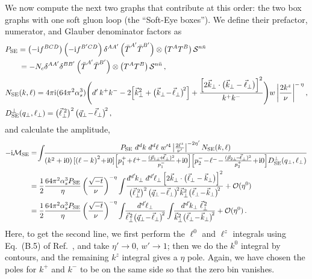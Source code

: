 \documentclass[letterpaper,11pt]{article}
\def\cS{\mathcal{S}}
\newcommand{\img}{\mathrm{i}}
\newcommand{\cM}{\mathcal{M}}
\newcommand{\as}{\alpha_s}
\newcommand{\nn}{\nonumber}
\newcommand\prp[1]{\vec #1_\perp}
\newcommand\prpsq[1]{\vec{#1}^{2}_\perp}
\newcommand\prpsqm[2]{\bigl( \prp{#1} \!-\! \prp{#2} \bigr)^{\!2}}
\newcommand\prnth[1]{\left(#1\right)}
\newcommand\reg[2]{\left| \frac{2 #1^z}{\nu} \right|^{-#2\eta}}
\newcommand{\bn}{{\bar n}}
\newcommand{\bT}{{\bar T}}
\newcommand{\dbar}{d\hspace*{-0.08em}\bar{}\hspace*{0.1em}}
\begin{document}
We now compute the next two graphs that contribute at this order: the two box graphs with one soft gluon loop (the ``Soft-Eye boxes'').
We define their prefactor, numerator, and Glauber denominator factors as
%
\begin{align}\label{eq:NSE}
&P_\text{SE} = \prnth{-\img f^{BCD}} \prnth{-\img f^{B'CD}} \delta^{AA'} \prnth{\bT^{A'} \bT^{B'}} \otimes \prnth{T^{A} T^B} \cS^{n\bn}
\nn\\
&\quad~~\,= - N_c \delta^{AA'}\delta^{BB'} \prnth{\bT^{A'} \bT^{B'}} \otimes \prnth{T^{A} T^B} \cS^{n\bn}\,,
\nn
\\
&N_\text{SE}(k,\ell) = 4\pi \img (64 \pi^2 \as^3)\Bigg( d'\,k^+ k^- 
- 2 \Bigl[\prpsq{k} + \prpsqm{k}{\ell}\Bigr] + \frac{\Bigl[ 2\prp{k} \cdot \bigl( \prp{k} - \prp{\ell} \bigr) \Bigr]^2}{k^+k^-}\Biggr) w\reg{k}\,,
\nn \\
&D_\text{SE}^\perp(q_\perp,\ell_\perp) = \bigl(\prp{\ell}^{\;2}\bigr)^2 \, \prpsqm{q}{\ell} \, ,
\end{align}
%
and calculate the amplitude,
%
\begin{align}
-\img\cM_{\rm SE} &= \! 
    \int\!\!\frac{P_\text{SE}\ \dbar^dk \; \dbar^d\ell \; w'^4 \left| \frac{2 \ell^z}{\nu'} \right|^{-2 \eta'}N_\text{SE}(k,\ell)}{
    \prnth{k^2 + \img0} [\prnth{\ell-k}^2\!+\!\img0]
    \Bigl[p_1^+ \!+\! \ell^+ \!-\! 
    \frac{(\vec p_{1\perp}\!+\! \vec\ell_\perp)^2}{p_1^-} \!+\! \img0\Bigr]
    \Bigl[p_2^- \!-\! \ell^- \!-\! \frac{(\vec p_{2\perp} \!-\!  \vec\ell_\perp)^2}{p_2^+} \!+\! \img0 \Bigr]
    D_\text{SE}^\perp(q_\perp,\ell_\perp)
    }
\nn \\
&= \frac12 \frac{64 \pi^2 \as^3 P_\text{SE}}{\eta}  \left(\frac{\sqrt{-t}}{\nu}\right)^{-\eta}
\int\!\frac{\dbar^{d'}\!k_\perp \; \dbar^{d'}\!\ell_\perp\left[ 2\prp{k} \cdot \bigl(\prp{\ell}- \prp{k} \bigr) \right]^2 }{
\bigl(\prp{\ell}^{\;2}\bigr)^2\, \prpsqm{q}{\ell} \prpsq{k} \prpsqm{\ell}{k}
} + \mathcal{O}(\eta^0)
\nn \\
&=  \frac12 \frac{64 \pi^2 \as^3 P_\text{SE}}{\eta}  \left(\frac{\sqrt{-t}}{\nu}\right)^{-\eta}
\int\!\!\frac{\dbar^{d'}\!\ell_\perp}{
\vec\ell_\perp^{\,2} \prpsqm{q}{\ell}
}
\int\!\! \frac{\dbar^{d'}\!k_\perp \; \vec\ell_\perp^{\,2}}{\prpsq{k} \prpsqm{\ell}{k}} + \mathcal{O}(\eta^0)
\,.
\label{eq:SoftEye}
\end{align}
%
Here, to get the second line, we first perform the $\ell^0$ and $\ell^z$ integrals using Eq.~(B.5) of Ref.~\cite{Rothstein:2016bsq}, and take $\eta' \to 0$, $w' \to 1$;
then we do the $k^0$ integral by contours, and the remaining $k^z$ integral gives a $\eta$ pole. Again, we have chosen the poles for $k^+$ and $k^-$ to be on the same side so that the zero bin vanishes.
\end{document}
